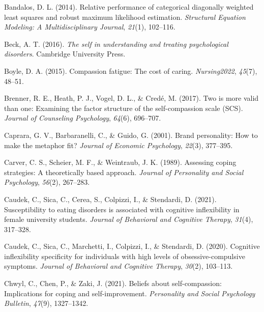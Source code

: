 \documentclass[
  man]{apa7}
\newlength{\cslhangindent}
\newlength{\cslentryspacingunit} %
\newenvironment{CSLReferences}[2] %
 {%
  \setlength{\parindent}{0pt}
  \ifodd #1
  \let\oldpar\par
  \def\par{\hangindent=\cslhangindent\oldpar}
  \fi
  \setlength{\parskip}{#2\cslentryspacingunit}
 }%
 {}
\begin{document}
\hypertarget{refs}{}
\begin{CSLReferences}{1}{0}
\leavevmode{}%
Bandalos, D. L. (2014). Relative performance of categorical diagonally weighted least squares and robust maximum likelihood estimation. \emph{Structural Equation Modeling: A Multidisciplinary Journal}, \emph{21}(1), 102--116.

\leavevmode{}%
Beck, A. T. (2016). \emph{The self in understanding and treating psychological disorders}. Cambridge University Press.

\leavevmode{}%
Boyle, D. A. (2015). Compassion fatigue: The cost of caring. \emph{Nursing2022}, \emph{45}(7), 48--51.

\leavevmode{}%
Brenner, R. E., Heath, P. J., Vogel, D. L., \& Credé, M. (2017). Two is more valid than one: Examining the factor structure of the self-compassion scale (SCS). \emph{Journal of Counseling Psychology}, \emph{64}(6), 696--707.

\leavevmode{}%
Caprara, G. V., Barbaranelli, C., \& Guido, G. (2001). Brand personality: How to make the metaphor fit? \emph{Journal of Economic Psychology}, \emph{22}(3), 377--395.

\leavevmode{}%
Carver, C. S., Scheier, M. F., \& Weintraub, J. K. (1989). Assessing coping strategies: A theoretically based approach. \emph{Journal of Personality and Social Psychology}, \emph{56}(2), 267--283.

\leavevmode{}%
Caudek, C., Sica, C., Cerea, S., Colpizzi, I., \& Stendardi, D. (2021). Susceptibility to eating disorders is associated with cognitive inflexibility in female university students. \emph{Journal of Behavioral and Cognitive Therapy}, \emph{31}(4), 317--328.

\leavevmode{}%
Caudek, C., Sica, C., Marchetti, I., Colpizzi, I., \& Stendardi, D. (2020). Cognitive inflexibility specificity for individuals with high levels of obsessive-compulsive symptoms. \emph{Journal of Behavioral and Cognitive Therapy}, \emph{30}(2), 103--113.

\leavevmode{}%
Chwyl, C., Chen, P., \& Zaki, J. (2021). Beliefs about self-compassion: Implications for coping and self-improvement. \emph{Personality and Social Psychology Bulletin}, \emph{47}(9), 1327--1342.


\end{CSLReferences}
\end{document}
